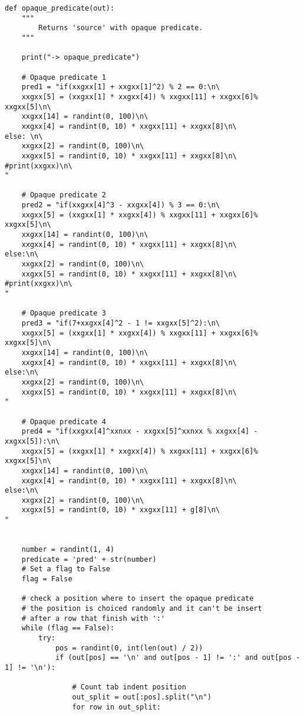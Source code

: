 \documentclass[a4paper,oneside,openright,titlepage,10pt,footinclude,headinclude]{scrbook}
\begin{document}
\begin{graybox}[innerleftmargin=2,]
\begin{lstlisting}
def opaque_predicate(out):
    """
        Returns 'source' with opaque predicate.
    """

    print("-> opaque_predicate")

    # Opaque predicate 1
    pred1 = "if(xxgxx[1] + xxgxx[1]^2) % 2 == 0:\n\
    xxgxx[5] = (xxgxx[1] * xxgxx[4]) % xxgxx[11] + xxgxx[6]% xxgxx[5]\n\
    xxgxx[14] = randint(0, 100)\n\
    xxgxx[4] = randint(0, 10) * xxgxx[11] + xxgxx[8]\n\
else: \n\
    xxgxx[2] = randint(0, 100)\n\
    xxgxx[5] = randint(0, 10) * xxgxx[11] + xxgxx[8]\n\
#print(xxgxx)\n\
"
    
    # Opaque predicate 2
    pred2 = "if(xxgxx[4]^3 - xxgxx[4]) % 3 == 0:\n\
    xxgxx[5] = (xxgxx[1] * xxgxx[4]) % xxgxx[11] + xxgxx[6]% xxgxx[5]\n\
    xxgxx[14] = randint(0, 100)\n\
    xxgxx[4] = randint(0, 10) * xxgxx[11] + xxgxx[8]\n\
else:\n\
    xxgxx[2] = randint(0, 100)\n\
    xxgxx[5] = randint(0, 10) * xxgxx[11] + xxgxx[8]\n\
#print(xxgxx)\n\
"

    # Opaque predicate 3
    pred3 = "if(7+xxgxx[4]^2 - 1 != xxgxx[5]^2):\n\
    xxgxx[5] = (xxgxx[1] * xxgxx[4]) % xxgxx[11] + xxgxx[6]% xxgxx[5]\n\
    xxgxx[14] = randint(0, 100)\n\
    xxgxx[4] = randint(0, 10) * xxgxx[11] + xxgxx[8]\n\
else:\n\
    xxgxx[2] = randint(0, 100)\n\
    xxgxx[5] = randint(0, 10) * xxgxx[11] + xxgxx[8]\n\
"
    
    # Opaque predicate 4
    pred4 = "if(xxgxx[4]^xxnxx - xxgxx[5]^xxnxx % xxgxx[4] - xxgxx[5]):\n\
    xxgxx[5] = (xxgxx[1] * xxgxx[4]) % xxgxx[11] + xxgxx[6]% xxgxx[5]\n\
    xxgxx[14] = randint(0, 100)\n\
    xxgxx[4] = randint(0, 10) * xxgxx[11] + xxgxx[8]\n\
else:\n\
    xxgxx[2] = randint(0, 100)\n\
    xxgxx[5] = randint(0, 10) * xxgxx[11] + g[8]\n\
"


    number = randint(1, 4)
    predicate = 'pred' + str(number)
    # Set a flag to False
    flag = False

    # check a position where to insert the opaque predicate
    # the position is choiced randomly and it can't be insert
    # after a row that finish with ':'
    while (flag == False):
        try:
            pos = randint(0, int(len(out) / 2))
            if (out[pos] == '\n' and out[pos - 1] != ':' and out[pos - 1] != '\n'):

                # Count tab indent position
                out_split = out[:pos].split("\n")
                for row in out_split:


\end{lstlisting}
\end{graybox}
\end{document}
